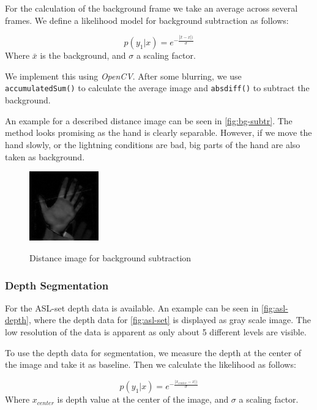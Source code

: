 \documentclass[letterpaper, 10 pt, conference]{ieeeconf}  %
\begin{document}
For the calculation of the background frame we take an average across several frames. We define a likelihood model for background subtraction as follows:

\begin{equation}
p(y_1 | x) = e^{-\frac{|\bar{x}-x|)}{\sigma}}
\label{eq:backg}
\end{equation}
Where $\bar{x}$ is the background, and $\sigma$ a scaling factor.

We implement this using \textit{OpenCV}. After some blurring, we use \texttt{accumulatedSum()} to calculate the average image and \texttt{absdiff()} to subtract the background.

An example for a described distance image can be seen in \autoref{fig:bg-subtr}. The method looks promising as the hand is clearly separable. However, if we move the hand slowly, or the lightning conditions are bad, big parts of the hand are also taken as background.

\begin{figure}[ht!]
\centering
	\includegraphics[height=3cm]{bg-subtr}
	\label{fig:bg-subtr}
	\caption{Distance image for background subtraction}
\end{figure}

\subsubsection{Depth Segmentation}

For the ASL-set depth data is available. An example can be seen in \autoref{fig:asl-depth}, where the depth data for \autoref{fig:asl-set} is displayed as gray scale image. The low resolution of the data is apparent as only about 5 different levels are visible.

To use the depth data for segmentation, we measure the depth at the center of the image and take it as baseline. Then we calculate the likelihood as follows:

\begin{equation}
p(y_1 | x) = e^{-\frac{|x_{center}-x|)}{\sigma}}
\label{eq:backg}
\end{equation}
Where $x_ {center}$ is depth value at the center of the image, and $\sigma$ a scaling factor.
\end{document}
